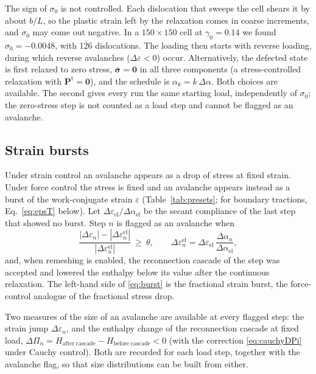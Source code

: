 \documentclass[11pt,a4paper]{article}
\newcommand{\sigb}{\bar{\bm\sigma}}
\newcommand{\Pt}{\mathbf P^{\mathrm t}}
\begin{document}
The sign of \(\sigma_0\) is not controlled. Each dislocation that sweeps the cell shears it by about
\(b/L\), so the plastic strain left by the relaxation comes in coarse increments, and \(\sigma_0\) may
come out negative. In a \(150\times150\) cell at \(\gamma_0=0.14\) we found \(\sigma_0=-0.0048\), with
126 dislocations. The loading then starts with reverse loading, during which reverse avalanches
(\(\Delta\varepsilon<0\)) occur. Alternatively, the defected state is first relaxed to zero stress,
\(\sigb=\mathbf 0\) in all three components (a stress-controlled relaxation with
\(\Pt=\mathbf 0\)), and the schedule is \(\alpha_k=k\,\Delta\alpha\). Both choices are available. The
second gives every run the same starting load, independently of \(\sigma_0\); the zero-stress step is
not counted as a load step and cannot be flagged as an avalanche.

\subsection{Strain bursts}

Under strain control an avalanche appears as a drop of stress at fixed strain. Under force control
the stress is fixed and an avalanche appears instead as a burst of the work-conjugate strain
\(\varepsilon\) (Table~\ref{tab:presets}; for boundary tractions, Eq.~\eqref{eq:epsT} below). Let
\(\Delta\varepsilon_{\mathrm{el}}/\Delta\alpha_{\mathrm{el}}\) be the secant compliance of the last
step that showed no burst. Step \(n\) is flagged as an avalanche when
\begin{equation}
  \frac{|\Delta\varepsilon_n|-|\Delta\varepsilon^{\mathrm{el}}_n|}{|\Delta\varepsilon^{\mathrm{el}}_n|}
  \ \ge\ \theta,
  \qquad
  \Delta\varepsilon^{\mathrm{el}}_n=\Delta\varepsilon_{\mathrm{el}}\,
  \frac{\Delta\alpha_n}{\Delta\alpha_{\mathrm{el}}},
  \label{eq:burst}
\end{equation}
and, when remeshing is enabled, the reconnection cascade of the step was accepted and lowered the
enthalpy below its value after the continuous relaxation. The left-hand side of \eqref{eq:burst}
is the fractional strain burst, the force-control analogue of the fractional stress drop.

Two measures of the size of an avalanche are available at every flagged step: the strain jump
\(\Delta\varepsilon_n\), and the enthalpy change of the reconnection cascade at fixed load,
\(\Delta\Pi_n=H_{\mathrm{after\ cascade}}-H_{\mathrm{before\ cascade}}<0\) (with the correction
\eqref{eq:cauchyDPi} under Cauchy control). Both are recorded for each load step, together with the
avalanche flag, so that size distributions can be built from either.
\end{document}
